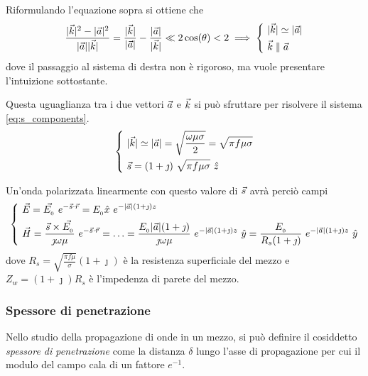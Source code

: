 		Riformulando l'equazione sopra si ottiene che
		\begin{equation*}
			\frac{|\vec{k}|^2 - |\vec{a}|^2}{|\vec{a}| |\vec{k}|}
				= \frac{|\vec{k}|}{|\vec{a}|} - \frac{|\vec{a}|}{|\vec{k}|}
				\ll 2 \cos(\theta) < 2 \implies
				\begin{dcases}
					~ |\vec{k}| \simeq |\vec{a}| \\
					~ \vec{k} \parallel \vec{a}
				\end{dcases}
		\end{equation*}
		dove il passaggio al sistema di destra non è rigoroso, ma vuole presentare l'intuizione sottostante.

		Questa uguaglianza tra i due vettori $\vec{a}$ e $\vec{k}$ si può sfruttare per risolvere il sistema \ref{eq:s_components}.
		\begin{equation*}
			\begin{dcases}
				~ |\vec{k}| \simeq |\vec{a}|
					= \sqrt{\frac{\omega \mu \sigma}{2}}
					= \sqrt{\pi f \mu \sigma} \\
				~ \vec{s} = (1 + \jmath) ~ \sqrt{\pi f \mu \sigma} ~ \hat{z} \\
			\end{dcases}
		\end{equation*}

		Un'onda polarizzata linearmente con questo valore di $\vec{s}$ avrà perciò campi
		\begin{equation*}
			\begin{dcases}
				~ \vec{E} = \vec{E_{_{0}}} ~ e^{-\vec{s} \cdot \vec{r}} = E_{_{0}} \hat{x} ~ e^{-|\vec{a}| (1 + \jmath) z} \\
				~ \vec{H} = \frac{\vec{s} \times \vec{E_{_{0}}}}{\jmath \omega \mu} ~ e^{-\vec{s} \cdot \vec{r}}
					= \ldots = \frac{E_{_{0}} |\vec{a}| (1 + \jmath)}{\jmath \omega \mu} ~ e^{-|\vec{a}| (1 + \jmath) z} ~ \hat{y}
					= \frac{E_{_{0}}}{ R_s (1 + \jmath) } ~ e^{-|\vec{a}| (1 + \jmath) z} ~ \hat{y}
			\end{dcases}
		\end{equation*}
		dove $R_s = \sqrt{\frac{\pi f \mu}{\sigma}} (1 + \jmath)$ è la resistenza superficiale del mezzo e $Z_w = (1 + \jmath) R_s$ è l'impedenza di parete del mezzo.

		\subsubsection{Spessore di penetrazione}
		Nello studio della propagazione di onde in un mezzo, si può definire il cosiddetto \emph{spessore di penetrazione} come la distanza $\delta$ lungo l'asse di propagazione per cui il modulo del campo cala di un fattore $e^{-1}$.

